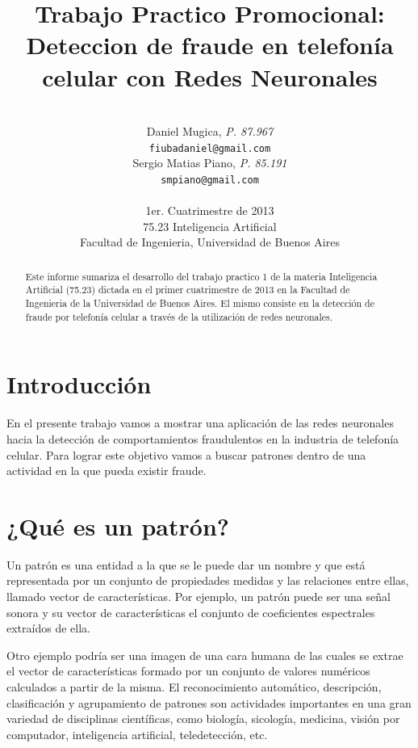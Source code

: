 \documentclass[a4paper,11pt]{article}
\title{\textbf{Trabajo Practico Promocional: Deteccion de fraude en
telefonía celular con Redes Neuronales}}
\author{\\
  Daniel Mugica, \textit{P. 87.967}                                \\
  \texttt{fiubadaniel@gmail.com}                                   \\ [2.5ex]
  Sergio Matias Piano, \textit{P. 85.191}                          \\
  \texttt{smpiano@gmail.com}                                       \\ [2.5ex]
                                                                   \\
  \normalsize{1er. Cuatrimestre de 2013}                           \\
  \normalsize{75.23 Inteligencia Artificial}                       \\
  \normalsize{Facultad de Ingenieria, Universidad de Buenos Aires} \\
}
\date{}
\begin{document}
\thispagestyle{empty}
\maketitle

\begin{abstract}

  Este informe sumariza el desarrollo del trabajo practico 1 de la materia
  Inteligencia Artificial (75.23) dictada en el primer cuatrimestre de
  2013 en la Facultad de Ingenieria de la Universidad de Buenos Aires. El mismo
  consiste en la detección de fraude por telefonía celular a través de la
  utilización de redes neuronales.

\end{abstract}

\clearpage



\section{Introducción}


En el  presente  trabajo  vamos  a  mostrar  una  aplicación  de  las  redes
neuronales  hacia  la  detección  de  comportamientos  fraudulentos  en   la
industria de telefonía celular. Para lograr este  objetivo  vamos  a  buscar
patrones dentro de una actividad en la que pueda existir fraude.


\section{¿Qué es un patrón?}


      Un patrón es una entidad a la que se le puede  dar  un  nombre  y  que
está representada por un conjunto de propiedades medidas  y  las  relaciones
entre ellas, llamado vector de características.
Por  ejemplo,  un  patrón  puede  ser  una  señal  sonora  y  su  vector  de
características el conjunto de coeficientes espectrales extraídos de ella.

      Otro ejemplo podría ser una imagen de una cara humana  de  las  cuales
se extrae el vector de características formado por un  conjunto  de  valores
numéricos calculados a partir de la  misma.  El  reconocimiento  automático,
descripción,  clasificación  y  agrupamiento  de  patrones  son  actividades
importantes en una gran variedad de disciplinas científicas, como  biología,
sicología,  medicina,  visión  por  computador,   inteligencia   artificial,
teledetección, etc.
\end{document}
